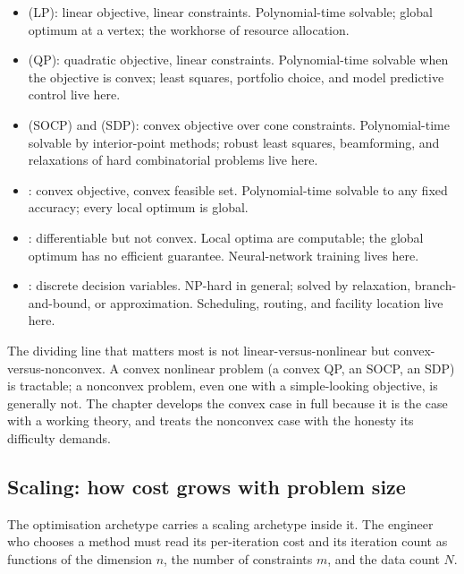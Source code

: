 \begin{itemize}[leftmargin=*]
  \item {} (LP): linear objective, linear
    constraints. Polynomial-time solvable; global optimum at a
    vertex; the workhorse of resource allocation.
  \item {} (QP): quadratic objective,
    linear constraints. Polynomial-time solvable when the
    objective is convex; least squares, portfolio choice, and
    model predictive control live here.
  \item {} (SOCP) and
     (SDP): convex objective over
    cone constraints. Polynomial-time solvable by interior-point
    methods; robust least squares, beamforming, and relaxations
    of hard combinatorial problems live here.
  \item {}: convex objective,
    convex feasible set. Polynomial-time solvable to any fixed
    accuracy; every local optimum is global.
  \item {}: differentiable but
    not convex. Local optima are computable; the global optimum
    has no efficient guarantee. Neural-network training lives
    here.
  \item {}: discrete
    decision variables. NP-hard in general; solved by relaxation,
    branch-and-bound, or approximation. Scheduling, routing, and
    facility location live here.
\end{itemize}

The dividing line that matters most is not linear-versus-nonlinear
but convex-versus-nonconvex. A convex nonlinear problem (a convex
QP, an SOCP, an SDP) is tractable; a nonconvex problem, even one
with a simple-looking objective, is generally not. The chapter
develops the convex case in full because it is the case with a
working theory, and treats the nonconvex case with the honesty
its difficulty demands.

\subsection{Scaling: how cost grows with problem size}

The optimisation archetype carries a scaling archetype inside it.
The engineer who chooses a method must read its per-iteration cost
and its iteration count as functions of the dimension $n$, the
number of constraints $m$, and the data count $N$.

